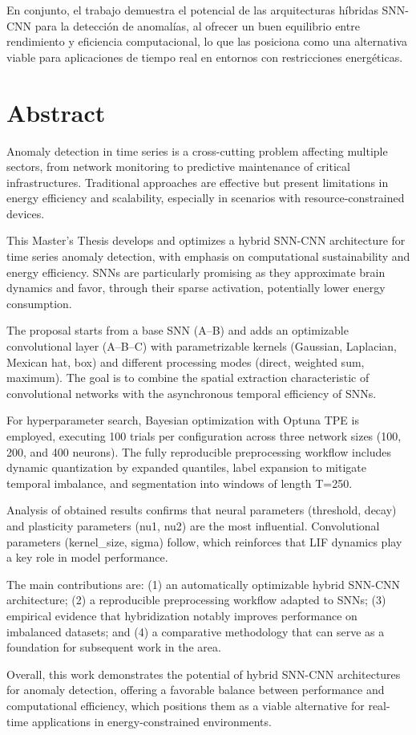 En conjunto, el trabajo demuestra el potencial de las arquitecturas híbridas SNN-CNN para la detección de anomalías, al ofrecer un buen equilibrio entre rendimiento y eficiencia computacional, lo que las posiciona como una alternativa viable para aplicaciones de tiempo real en entornos con restricciones energéticas.

\chapter*{Abstract}
\label{chap:resumen}

Anomaly detection in time series is a cross-cutting problem affecting multiple sectors, from network monitoring to predictive maintenance of critical infrastructures. Traditional approaches are effective but present limitations in energy efficiency and scalability, especially in scenarios with resource-constrained devices.

This Master's Thesis develops and optimizes a hybrid SNN-CNN architecture for time series anomaly detection, with emphasis on computational sustainability and energy efficiency. SNNs are particularly promising as they approximate brain dynamics and favor, through their sparse activation, potentially lower energy consumption.

The proposal starts from a base SNN (A--B) and adds an optimizable convolutional layer (A--B--C) with parametrizable kernels (Gaussian, Laplacian, Mexican hat, box) and different processing modes (direct, weighted sum, maximum). The goal is to combine the spatial extraction characteristic of convolutional networks with the asynchronous temporal efficiency of SNNs.

For hyperparameter search, Bayesian optimization with Optuna TPE is employed, executing 100 trials per configuration across three network sizes (100, 200, and 400 neurons). The fully reproducible preprocessing workflow includes dynamic quantization by expanded quantiles, label expansion to mitigate temporal imbalance, and segmentation into windows of length T=250.

Analysis of obtained results confirms that neural parameters (threshold, decay) and plasticity parameters (nu1, nu2) are the most influential. Convolutional parameters (kernel\_size, sigma) follow, which reinforces that LIF dynamics play a key role in model performance.

The main contributions are: (1) an automatically optimizable hybrid SNN-CNN architecture; (2) a reproducible preprocessing workflow adapted to SNNs; (3) empirical evidence that hybridization notably improves performance on imbalanced datasets; and (4) a comparative methodology that can serve as a foundation for subsequent work in the area.

Overall, this work demonstrates the potential of hybrid SNN-CNN architectures for anomaly detection, offering a favorable balance between performance and computational efficiency, which positions them as a viable alternative for real-time applications in energy-constrained environments.